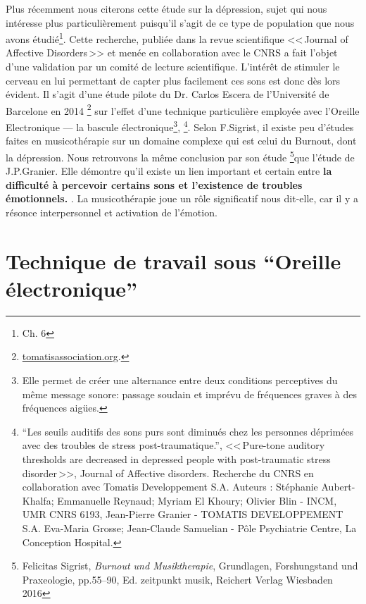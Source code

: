 Plus récemment nous citerons cette étude sur la dépression, sujet qui nous intéresse plus particulièrement puisqu'il s'agit de ce type de population que nous avons étudié\footnote{Ch. 6}. Cette recherche, publiée dans la revue scientifique <<\,Journal
of Affective Disorders\,>> et menée en collaboration avec le CNRS a fait l'objet d'une validation
par un comité de lecture scientifique. 
L'intérêt de stimuler
le cerveau en lui permettant de capter plus facilement ces sons est
donc dès lors évident. Il s'agit d'une étude pilote du Dr. Carlos Escera
de l'Université de Barcelone en 2014%
\footnote{%
\href{http://tomatisassociation.org/scientific-validation-of-the-tomatis-effect-eeg-recordings-of-sound-from-brainstem-to-cerebral-cortex-encoding-university-of-barcelona-2014/}{tomatisassociation.org}.} sur l'effet d'une technique particulière employée avec l'Oreille Electronique
--- la bascule \label{bascule} électronique\footnote{Elle permet de créer une alternance entre deux conditions perceptives du même message sonore: passage soudain et imprévu de fréquences graves à des fréquences aigües.},%
\footnote{``Les seuils auditifs des sons purs 
		sont diminués chez les personnes déprimées avec des
		troubles de stress post-traumatique.'', <<\,Pure-tone auditory thresholds are decreased in depressed people with post-traumatic stress disorder\,>>, Journal of Affective disorders. Recherche du CNRS en collaboration
		avec Tomatis Developpement S.A. Auteurs : Stéphanie Aubert-Khalfa; Emmanuelle Reynaud; Myriam El Khoury;
		Olivier Blin - INCM, UMR CNRS 6193, Jean-Pierre Granier -
		TOMATIS DEVELOPPEMENT S.A. Eva-Maria Grosse; Jean-Claude Samuelian - Pôle Psychiatrie Centre, La Conception Hospital.}.
Selon F.Sigrist, il existe peu d'études faites en musicothérapie sur un domaine complexe qui est celui du Burnout, dont la dépression. Nous retrouvons la même conclusion par son étude \footnote{Felicitas Sigrist,  \textit{Burnout und Musiktherapie}, Grundlagen, Forshungstand und Praxeologie, pp.55--90, Ed. zeitpunkt musik, Reichert Verlag Wiesbaden 2016}que l'étude  de J.P.Granier. Elle démontre qu'il existe
un lien important et certain entre \textbf{la difficulté à percevoir
	certains sons et l'existence de troubles émotionnels. }. La musicothérapie joue un rôle significatif nous dit-elle, car il y a résonce interpersonnel et activation de l'émotion.





\section{Technique de travail sous ``Oreille électronique''}

